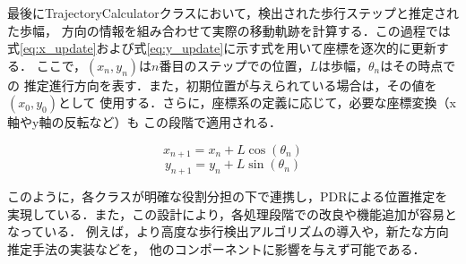 最後にTrajectoryCalculatorクラスにおいて，検出された歩行ステップと推定された歩幅，
方向の情報を組み合わせて実際の移動軌跡を計算する．この過程では式\ref{eq:x_update}および式\ref{eq:y_update}に示す式を用いて座標を逐次的に更新する．
ここで，$(x_n, y_n)$は$n$番目のステップでの位置，$L$は歩幅，$\theta_n$はその時点での
推定進行方向を表す．また，初期位置が与えられている場合は，その値を$(x_0, y_0)$として
使用する．さらに，座標系の定義に応じて，必要な座標変換（x軸やy軸の反転など）も
この段階で適用される．




\begin{equation}
\label{eq:x_update}
x_{n+1} = x_n + L \cos(\theta_n)
\end{equation}
\begin{equation}
\label{eq:y_update}
y_{n+1} = y_n + L \sin(\theta_n)
\end{equation}


このように，各クラスが明確な役割分担の下で連携し，PDRによる位置推定を
実現している．また，この設計により，各処理段階での改良や機能追加が容易となっている．
例えば，より高度な歩行検出アルゴリズムの導入や，新たな方向推定手法の実装などを，
他のコンポーネントに影響を与えず可能である．


